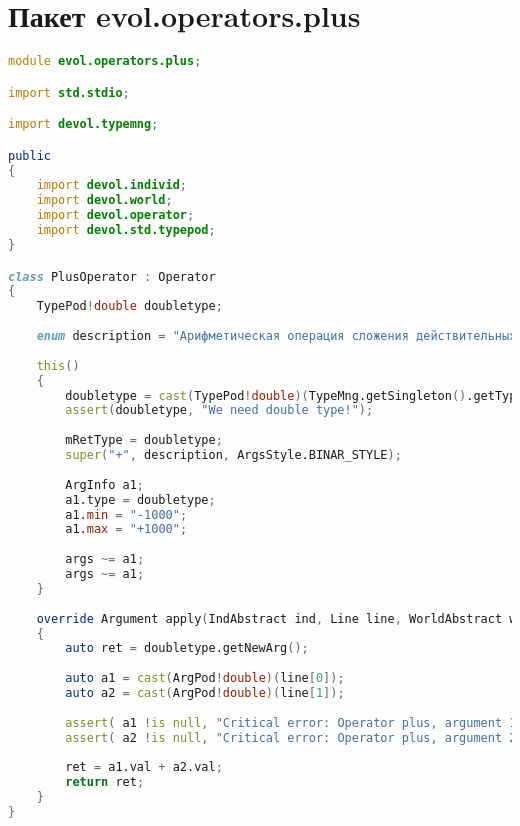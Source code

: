 \documentclass[russian,utf8,emptystyle]{eskdtext}
\begin{document}
\section{Пакет evol.operators.plus}
\begin{lstlisting}[language=D]
module evol.operators.plus;

import std.stdio;

import devol.typemng;

public
{
    import devol.individ;
    import devol.world;
    import devol.operator;
    import devol.std.typepod;
}

class PlusOperator : Operator
{
    TypePod!double doubletype;
    
    enum description = "Арифметическая операция сложения действительных чисел.";
    
    this()
    {
        doubletype = cast(TypePod!double)(TypeMng.getSingleton().getType("Typedouble"));
        assert(doubletype, "We need double type!");
        
        mRetType = doubletype;
        super("+", description, ArgsStyle.BINAR_STYLE);
        
        ArgInfo a1;
        a1.type = doubletype;
        a1.min = "-1000";
        a1.max = "+1000";
        
        args ~= a1;
        args ~= a1;
    }
    
    override Argument apply(IndAbstract ind, Line line, WorldAbstract world)
    {
        auto ret = doubletype.getNewArg();
        
        auto a1 = cast(ArgPod!double)(line[0]);
        auto a2 = cast(ArgPod!double)(line[1]);
        
        assert( a1 !is null, "Critical error: Operator plus, argument 1 isn't a right value!");
        assert( a2 !is null, "Critical error: Operator plus, argument 2 isn't a right value!");
        
        ret = a1.val + a2.val;
        return ret;
    }   
}
\end{lstlisting}
\end{document}
